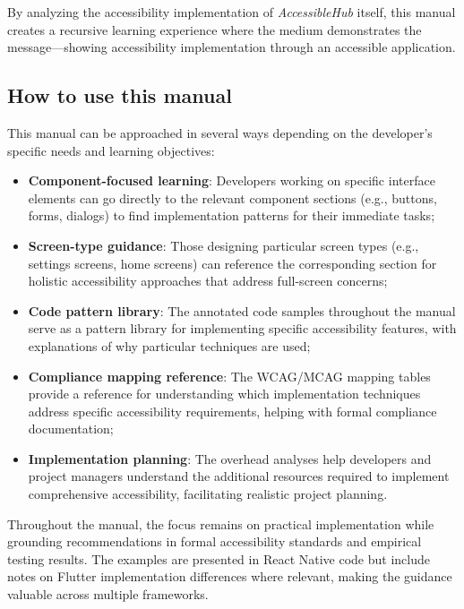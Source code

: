 By analyzing the accessibility implementation of \textit{AccessibleHub} itself, this manual creates a recursive learning experience where the medium demonstrates the message—showing accessibility implementation through an accessible application.

\subsection{How to use this manual}
\label{subsec:dev-usage}

This manual can be approached in several ways depending on the developer's specific needs and learning objectives:

\begin{itemize}
    \item \textbf{Component-focused learning}: Developers working on specific interface elements can go directly to the relevant component sections (e.g., buttons, forms, dialogs) to find implementation patterns for their immediate tasks;
    
    \item \textbf{Screen-type guidance}: Those designing particular screen types (e.g., settings screens, home screens) can reference the corresponding section for holistic accessibility approaches that address full-screen concerns;
    
    \item \textbf{Code pattern library}: The annotated code samples throughout the manual serve as a pattern library for implementing specific accessibility features, with explanations of why particular techniques are used;
    
    \item \textbf{Compliance mapping reference}: The WCAG/MCAG mapping tables provide a reference for understanding which implementation techniques address specific accessibility requirements, helping with formal compliance documentation;
    
    \item \textbf{Implementation planning}: The overhead analyses help developers and project managers understand the additional resources required to implement comprehensive accessibility, facilitating realistic project planning.
\end{itemize}

Throughout the manual, the focus remains on practical implementation while grounding recommendations in formal accessibility standards and empirical testing results. The examples are presented in React Native code but include notes on Flutter implementation differences where relevant, making the guidance valuable across multiple frameworks.

